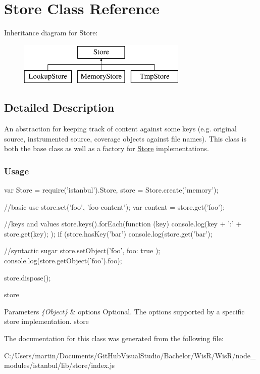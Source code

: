 \hypertarget{class_store}{}\section{Store Class Reference}
\label{class_store}
Inheritance diagram for Store\+:\begin{figure}[H]
\begin{center}
\leavevmode
\includegraphics[height=2.000000cm]{class_store}
\end{center}
\end{figure}


\subsection{Detailed Description}
An abstraction for keeping track of content against some keys (e.\+g. original source, instrumented source, coverage objects against file names). This class is both the base class as well as a factory for {\ttfamily \hyperlink{class_store}{Store}} implementations.

\subsubsection*{Usage }

\begin{DoxyVerb} var Store = require('istanbul').Store,
     store = Store.create('memory');

 //basic use
 store.set('foo', 'foo-content');
 var content = store.get('foo');

 //keys and values
 store.keys().forEach(function (key) {
     console.log(key + ':\n' + store.get(key);
 });
 if (store.hasKey('bar') { console.log(store.get('bar'); }


 //syntactic sugar
 store.setObject('foo', { foo: true });
 console.log(store.getObject('foo').foo);

 store.dispose();
\end{DoxyVerb}


store 
\begin{DoxyParams}{Parameters}
{\em \{\+Object\}} & options Optional. The options supported by a specific store implementation.  store \\
\hline
\end{DoxyParams}


The documentation for this class was generated from the following file\+:\begin{DoxyCompactItemize}
\item 
C\+:/\+Users/martin/\+Documents/\+Git\+Hub\+Visual\+Studio/\+Bachelor/\+Wis\+R/\+Wis\+R/node\+\_\+modules/istanbul/lib/store/index.\+js\end{DoxyCompactItemize}
